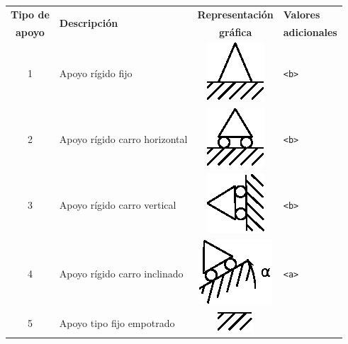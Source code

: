 \documentclass[a4paper,11pt]{article}
\begin{document}
\begin{table}
\begin{center}
\renewcommand{\arraystretch}{1.5}
\begin{tabular}{c p{4cm} c l}
\toprule
\textbf{Tipo de} & \multirow{2}{*}{\textbf{Descripci\'on}} & \textbf{Representaci\'on} & \textbf{Valores}     \\
\textbf{apoyo}   &                                         & \textbf{gr\'afica}        & \textbf{adicionales} \\
\midrule
1 & Apoyo r\'igido fijo & 
\multicolumn{1}{m{2cm}}{\centering\includegraphics{figures/apoyo_fijo.eps}} & 
\texttt{<b>} \\
\hline
2 & Apoyo r\'igido carro horizontal & 
\multicolumn{1}{m{2cm}}{\centering\includegraphics{figures/apoyo_carro_horizontal.eps}} &
\texttt{<b>} \\
\hline
3 & Apoyo r\'igido carro vertical & 
\multicolumn{1}{m{2cm}}{\centering\includegraphics{figures/apoyo_carro_vertical.eps}} & 
\texttt{<b>}\\
\hline
4 & Apoyo r\'igido carro inclinado & 
\multicolumn{1}{m{2cm}}{\centering\includegraphics{figures/apoyo_inclinado.eps}} & 
\texttt{<a>} \\
\hline
5 & Apoyo tipo fijo empotrado & 
\multicolumn{1}{m{2cm}}{\centering\includegraphics{figures/apoyo_empotramiento.eps}} & 

\end{tabular}
\end{center}
\end{table}
\end{document}
